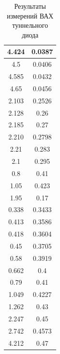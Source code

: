 \documentclass[a4paper,12pt]{report}
\begin{document}
\begin{table}[H]
\begin{tabular}{|c|c|}
4.424 & 0.0387 \\ \hline
4.5   & 0.0406 \\ \hline
4.585 & 0.0432 \\ \hline
4.65  & 0.0456 \\ \hline
2.103 & 0.2526 \\ \hline
2.128 & 0.26   \\ \hline
2.185 & 0.27   \\ \hline
2.210 & 0.2798 \\ \hline
2.21  & 0.283  \\ \hline
2.1   & 0.295  \\ \hline
0.8   & 0.41   \\ \hline
1.05  & 0.423  \\ \hline
1.95  & 0.17   \\ \hline
0.338 & 0.3433 \\ \hline
0.413 & 0.3586 \\ \hline
0.418 & 0.3604 \\ \hline
0.45  & 0.3705 \\ \hline
0.58  & 0.3919 \\ \hline
0.662 & 0.4    \\ \hline
0.79  & 0.41   \\ \hline
1.049 & 0.4227 \\ \hline
1.262 & 0.43   \\ \hline
2.247 & 0.45   \\ \hline
2.742 & 0.4573 \\ \hline
4.212 & 0.47   \\ \hline
\end{tabular}
\caption{Результаты измерений ВАХ туннельного диода}
\end{table}
\end{document}
